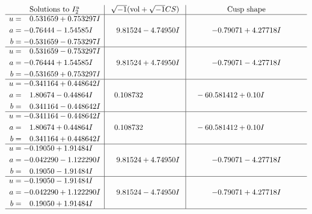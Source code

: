 \documentclass[1p]{elsarticle_modified}
\theoremstyle{definition}
\newcommand{\I}{\sqrt{-1}}
\begin{document}
$$\begin{array}{c|c|c}  
\text{Solutions to }I^u_{2}& \I (\text{vol} + \sqrt{-1}CS) & \text{Cusp shape}\\
 \hline 
\begin{aligned}
u &= \phantom{-}0.531659 + 0.753297 I \\
a &= -0.76444 - 1.54585 I \\
b &= -0.531659 - 0.753297 I\end{aligned}
 & \phantom{-}9.81524 - 4.74950 I & -0.79071 + 4.27718 I \\ \hline\begin{aligned}
u &= \phantom{-}0.531659 - 0.753297 I \\
a &= -0.76444 + 1.54585 I \\
b &= -0.531659 + 0.753297 I\end{aligned}
 & \phantom{-}9.81524 + 4.74950 I & -0.79071 - 4.27718 I \\ \hline\begin{aligned}
u &= -0.341164 + 0.448642 I \\
a &= \phantom{-}1.80674 - 0.44864 I \\
b &= \phantom{-}0.341164 - 0.448642 I\end{aligned}
 & \phantom{-}0.108732\phantom{ +0.000000I} & \phantom{-}                -6
0.581412 + 0. 10   I\phantom{ +0.000000I} \\ \hline\begin{aligned}
u &= -0.341164 - 0.448642 I \\
a &= \phantom{-}1.80674 + 0.44864 I \\
b &= \phantom{-}0.341164 + 0.448642 I\end{aligned}
 & \phantom{-}0.108732\phantom{ +0.000000I} & \phantom{-}                -6
0.581412 + 0. 10   I\phantom{ +0.000000I} \\ \hline\begin{aligned}
u &= -0.19050 + 1.91484 I \\
a &= -0.042290 - 1.122290 I \\
b &= \phantom{-}0.19050 - 1.91484 I\end{aligned}
 & \phantom{-}9.81524 + 4.74950 I & -0.79071 - 4.27718 I \\ \hline\begin{aligned}
u &= -0.19050 - 1.91484 I \\
a &= -0.042290 + 1.122290 I \\
b &= \phantom{-}0.19050 + 1.91484 I\end{aligned}
 & \phantom{-}9.81524 - 4.74950 I & -0.79071 + 4.27718 I\\
 \hline 
 \end{array}$$\newpage\newpage\renewcommand{\arraystretch}{1}
\end{document}
